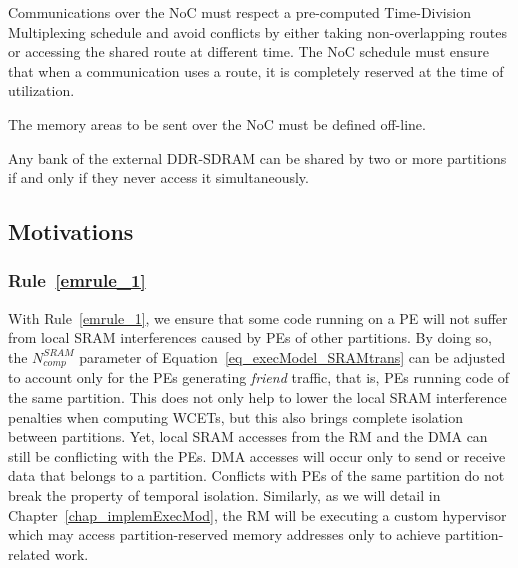 \documentclass[main.tex]{subfiles}
\begin{document}
\begin{emrule}
    Communications over the NoC must respect a pre-computed Time-Division
    Multiplexing schedule and avoid conflicts by either taking non-overlapping
    routes or accessing the shared route at different time. The NoC schedule
    must ensure that when a communication uses a route, it is completely
    reserved at the time of utilization.  \label{emrule_2}
\end{emrule}

\begin{emrule}
    The memory areas to be sent over the NoC must be defined off-line.
    \label{emrule_3}
\end{emrule}

\begin{emrule}
    Any bank of the external DDR-SDRAM can be shared by two or more partitions
    if and only if they never access it simultaneously.  \label{emrule_4}
\end{emrule}

\subsection{Motivations}
\subsubsection{Rule~\ref{emrule_1}}
With Rule~\ref{emrule_1}, we ensure that some code running on a PE will not
suffer from local SRAM interferences caused by PEs of other partitions. By
doing so, the $N_{comp}^{SRAM}$ parameter of
Equation~\ref{eq_execModel_SRAMtrans} can be adjusted to account only for the
PEs generating \emph{friend} traffic, that is, PEs running code of the same
partition. This does not only help to lower the local SRAM interference
penalties when computing WCETs, but this also brings complete isolation between
partitions.  Yet, local SRAM accesses from the RM and the DMA can still be
conflicting with the PEs. DMA accesses will occur only to send or receive data
that belongs to a partition. Conflicts with PEs of the same partition do not
break the property of temporal isolation. Similarly, as we will detail in
Chapter~\ref{chap_implemExecMod}, the RM will be executing a custom hypervisor
which may access partition-reserved memory addresses only to achieve
partition-related work.
\end{document}
